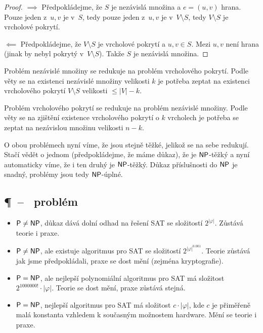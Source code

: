 \begin{proof}
$\implies$ Předpokládejme, že $S$ je nezávislá množina
a $e = (u,v)$ hrana. Pouze jeden z~$u,v$ je v~$S$,
tedy pouze jeden z~$u,v$ je v~$V \setminus S$, tedy $V \setminus S$ je
vrcholové pokrytí.

$\impliedby$ Předpokládejme, že $V \setminus S$ je vrcholové pokrytí
a $u, v \in S$. Mezi $u,v$ není hrana (jinak by nebyl pokrytý
v~$V \setminus S$). Takže $S$ je nezávislá množina.
\end{proof}

Problém nezávislé množiny se redukuje na problém vrcholového pokrytí.
Podle věty se na existenci nezávislé množiny velikosti $k$
je potřeba zeptat na existenci vrcholového pokrytí
$V \setminus S$ velikosti $ \leq \lvert V \rvert - k$.

Problém vrcholového pokrytí se redukuje na problém nezávislé množiny.
Podle věty se na zjištění existence vrcholového pokrytí o $k$ vrcholech
je potřeba se zeptat na nezávislou množinu velikosti $n-k$.

O obou problémech nyní víme, že jsou stejně těžké, jelikož se na sebe
redukují. Stačí vědět o jednom (předpokládejme, že máme důkaz), že je
${\mathsf{NP}}$-těžký a nyní automaticky víme, že i ten druhý je ${\mathsf{NP}}$-těžký.
Důkaz příslušnosti do ${\mathsf{NP}}$ je snadný, problémy jsou tedy ${\mathsf{NP}}$-úplné.

\subsection{\P\ -- \NP\ problém}

\begin{itemize}
\item ${\mathsf{P}} \neq {\ensuremath{\mathsf{NP}}}$, důkaz dává dolní odhad na řešení SAT se složitostí
    $2^{\lvert\varphi\rvert}$.
    Zůstává teorie i praxe.

\item ${\mathsf{P}} \neq {\ensuremath{\mathsf{NP}}}$, ale existuje algoritmus pro SAT se složitostí
    $2^{\lvert\varphi\rvert^{0.001}}$.
    Teorie zůstává jak jsme předpokládali, praxe se
    dost mění (zejména kryptografie).

\item ${\mathsf{P}} = {\mathsf{NP}}$, ale nejlepší polynomiální algoritmus pro SAT má
    složitost $2^{1000000!} \cdot \lvert \varphi \rvert$.  Teorie se
    dost mění, praxe zůstává stejná.

\item ${\mathsf{P}} = {\mathsf{NP}}$, nejlepší algoritmus pro SAT má složitost
    $c \cdot \lvert \varphi \rvert$, kde $c$ je přiměřeně malá konstanta
    vzhledem k současným možnostem hardware.
    Mění se teorie i praxe.
\end{itemize}

